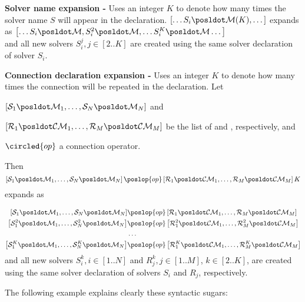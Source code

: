 \textbf{Solver name expansion - } Uses an integer $K$ to denote how many times the solver name $S$ will appear in the declaration. $\left[\dots S_i\posldot\mathcal{M}(K),\dots\right]$ expands as $\left[\dots S_i\posldot\mathcal{M}, S_i^2\posldot\mathcal{M},\dots S_i^K\posldot\mathcal{M}\dots\right]$\\
and all new solvers $S_i^j, j\in [2..K]$ are created using the same solver declaration of solver $S_i$.

\textbf{Connection declaration expansion - } Uses an integer $K$ to denote how many times the connection will be repeated in the declaration. Let 
\begin{inparaenum}[a)]
\item $\left[\mathcal{S}_1\posldot\mathcal{M}_1,\dots,\mathcal{S}_{N}\posldot\mathcal{M}_{N}\right]$ and 
\item $\left[\mathcal{R}_1\posldot\mathcal{CM}_1,\dots,\mathcal{R}_{M}\posldot\mathcal{CM}_{M}\right]$ be the list of \jacks{} and \outlets, respectively, and
\item $\circled{op}$ a connection operator.
\end{inparaenum} Then $$\left[\mathcal{S}_1\posldot\mathcal{M}_1,\dots,\mathcal{S}_{N}\posldot\mathcal{M}_{N}\right] \poslop{op} \left[\mathcal{R}_1\posldot\mathcal{CM}_1,\dots,\mathcal{R}_{M}\posldot\mathcal{CM}_{M}\right]K$$ expands as

\begin{align*}
\left[\mathcal{S}_1\posldot\mathcal{M}_1,\dots,\mathcal{S}_{N}\posldot\mathcal{M}_{N}\right] &\poslop{op} \left[\mathcal{R}_1\posldot\mathcal{CM}_1,\dots,\mathcal{R}_{M}\posldot\mathcal{CM}_{M}\right]\\
\left[\mathcal{S}_1^2\posldot\mathcal{M}_1,\dots,\mathcal{S}_{N}^2\posldot\mathcal{M}_{N}\right] &\poslop{op} \left[\mathcal{R}_1^2\posldot\mathcal{CM}_1,\dots,\mathcal{R}_{M}^2\posldot\mathcal{CM}_{M}\right]\\
&\dots\\
\left[\mathcal{S}_1^K\posldot\mathcal{M}_1,\dots,\mathcal{S}_{N}^K\posldot\mathcal{M}_{N}\right] &\poslop{op} \left[\mathcal{R}_1^K\posldot\mathcal{CM}_1,\dots,\mathcal{R}_{M}^K\posldot\mathcal{CM}_{M}\right]\\
\end{align*}
and all new solvers $S_i^k, i\in[1..N]$ and $R_j^k,j\in [1..M]$, $k\in[2..K]$, are created using the same solver declaration of solvers $S_i$ and $R_j$, respectively.

The following example explains clearly these syntactic sugars:

